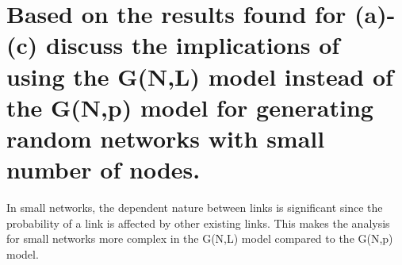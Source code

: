 \documentclass{article}%
\begin{document}
%
\section{Based on the results found for (a){-}(c) discuss the implications of using the G(N,L) model instead of the G(N,p) model for generating random networks with small number of nodes.}%
\label{sec:Basedontheresultsfoundfor(a){-}(c)discusstheimplicationsofusingtheG(N,L)modelinsteadoftheG(N,p)modelforgeneratingrandomnetworkswithsmallnumberofnodes.}%
In small networks, the dependent nature between links is significant since the probability of a link is affected by other existing links. This makes the analysis for small networks more complex in the G(N,L) model compared to the G(N,p) model.

%
\end{document}
